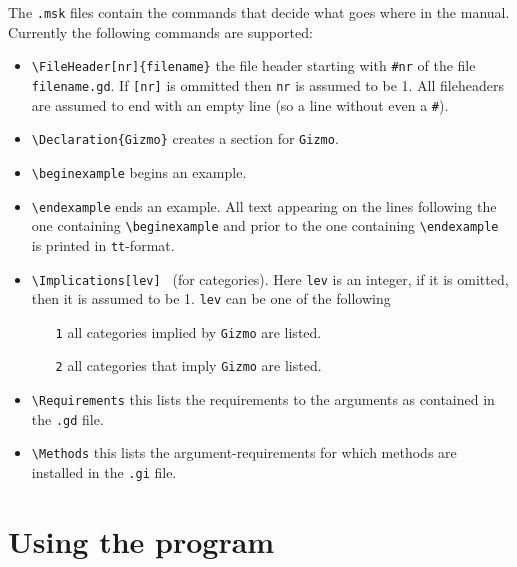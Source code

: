 \documentclass[a4wide]{article}
\begin{document}
The {\tt .msk} files contain the commands that decide what goes where in the
manual. Currently the following commands are supported:
\begin{itemize}
\item {\tt \verb!\!FileHeader[nr]\{filename\}} the file header 
starting with {\tt \#nr} of the file {\tt filename.gd}. 
If {\tt [nr]} is ommitted then {\tt nr} is assumed to be 1.
All fileheaders are assumed to end with an empty line (so a line without
even a {\tt \#}). 
\item {\tt \verb!\!Declaration\{Gizmo\}} creates a section for {\tt Gizmo}.
\item {\tt \verb!\!beginexample} begins an example.
\item {\tt \verb!\!endexample} ends an example. All text appearing on the
lines following the one containing {\tt \verb!\!beginexample} and prior to
the one containing {\tt \verb!\!endexample} is printed in {\tt tt}-format.
\item {\tt \verb!\!Implications[lev] } (for categories). Here {\tt lev} 
is an integer, if it is omitted, then it is assumed to be 1. {\tt lev} can be 
one of the following
\begin{itemize}
\item[{\tt 1}] all categories implied by {\tt Gizmo} are listed.
\item[{\tt 2}] all categories that imply {\tt Gizmo} are listed.
\end{itemize}

\item {\tt \verb!\!Requirements} this lists the requirements to the 
arguments as contained in the {\tt .gd} file.
\item {\tt \verb!\!Methods} this lists the argument-requirements for which 
methods are installed in the {\tt .gi} file. 
\end{itemize}

\section{Using the program}
\end{document}
